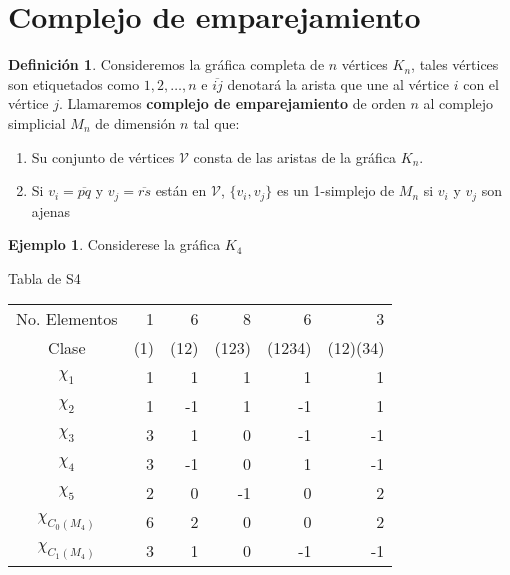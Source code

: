 \documentclass[12pt]{book}
\theoremstyle{definition}
\newtheorem{definition}[theorem]{Definición}
\newtheorem{example}[theorem]{Ejemplo}
\newcounter{in}
\newcounter{ini}
\begin{document}
{\section{Complejo de emparejamiento}

\begin{definition}
Consideremos la gráfica completa de $n$ vértices $K_{n}$, tales
vértices son etiquetados como $1,2,\ldots,n$ e
$\overline{ij}$ denotará la arista que une al vértice $i$ con el
vértice $j$. Llamaremos \textbf{complejo de emparejamiento} de orden
$n$ al complejo simplicial $M_{n}$ de dimensión $n$ tal que:

\begin{enumerate}
  \item Su conjunto de vértices $\mathcal{V}$ consta de las aristas de la gráfica
  $K_{n}$. 
  \item Si $v_{i}=\overline{pq}$ y $v_{j}=\overline{rs}$ están en
  $\mathcal{V}$, $\{v_{i},v_{j}\}$ es  un 1-simplejo de $M_{n}$ si $v_{i}$
  y $v_{j}$ son ajenas
\end{enumerate} 
\end{definition}

\begin{example}
Considerese la gráfica $K_{4}$
\end{example}


\bigskip
\bigskip
\bigskip
\bigskip
\bigskip
\bigskip
\bigskip
\bigskip
\bigskip
\bigskip

\begin{center}
Tabla de S4

\begin{tabular}{c|r r r r r}
  No. Elementos& 1 & 6 & 8 & 6 & 3 \\
  Clase & (1) & (12) & (123) & (1234) &(12)(34)\\
    \hline
  $\chi_{{1}}$ & 1 & 1 & 1 & 1 & 1 \\
  $\chi_{{2}}$ & 1 & -1 & 1 & -1 & 1\\
  $\chi_{{3}}$ & 3 & 1 & 0 & -1 & -1\\
  $\chi_{{4}}$ & 3 & -1 & 0 & 1 & -1 \\
  $\chi_{{5}}$ & 2 & 0 & -1 & 0 & 2 \\
    \hline
  $\chi_{C_{0}(M_{4})}$ & 6 & 2 & 0 & 0 & 2 \\
  $\chi_{C_{1}(M_{4})}$ & 3 & 1 & 0 & -1 & -1
\end{tabular}
\end{center}

\bigskip

}
\end{document}
